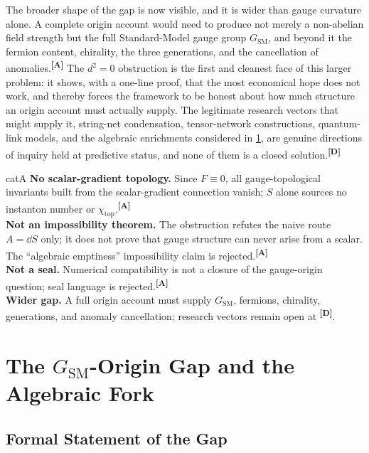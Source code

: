 \documentclass[12pt,a4paper,twoside]{article}
\theoremstyle{plain}
\theoremstyle{definition}
\theoremstyle{remark}
\newcommand{\catmark}[1]{\textsuperscript{\textsf{\textbf{[#1]}}}}
\begin{document}
The broader shape of the gap is now visible, and it is wider than gauge curvature alone. A complete origin account would need to produce not merely a non-abelian field strength but the full Standard-Model gauge group $G_{\mathrm{SM}}$, and beyond it the fermion content, chirality, the three generations, and the cancellation of anomalies.\catmark{A} The $d^2 = 0$ obstruction is the first and cleanest face of this larger problem: it shows, with a one-line proof, that the most economical hope does not work, and thereby forces the framework to be honest about how much structure an origin account must actually supply. The legitimate research vectors that might supply it, string-net condensation, tensor-network constructions, quantum-link models, and the algebraic enrichments considered in \cref{sec:algebraic-fork}, are genuine directions of inquiry held at predictive status, and none of them is a closed solution.\catmark{D}

\begin{evidencebox}{catA}
\textbf{No scalar-gradient topology.} Since $F \equiv 0$, all gauge-topological invariants built from the scalar-gradient connection vanish; $S$ alone sources no
instanton number or $\chi_{\mathrm{top}}$.\catmark{A}\\[0.3em]
\textbf{Not an impossibility theorem.} The obstruction refutes the naive route $A=\dd S$ only; it does not prove that gauge structure can never arise from a scalar. The ``algebraic emptiness'' impossibility claim is
rejected.\catmark{A}\\[0.3em]
\textbf{Not a seal.} Numerical compatibility is not a closure of the
gauge-origin question; seal language is rejected.\catmark{A}\\[0.3em]
\textbf{Wider gap.} A full origin account must supply $G_{\mathrm{SM}}$, fermions, chirality, generations, and anomaly cancellation; research vectors remain open at \catmark{D}.
\end{evidencebox}

\section{The \texorpdfstring{$G_{\mathrm{SM}}$}{G_SM}-Origin Gap and the Algebraic Fork}
\label{sec:algebraic-fork}

\subsection{Formal Statement of the Gap}
\label{subsec:gsm-gap-statement}
\end{document}
